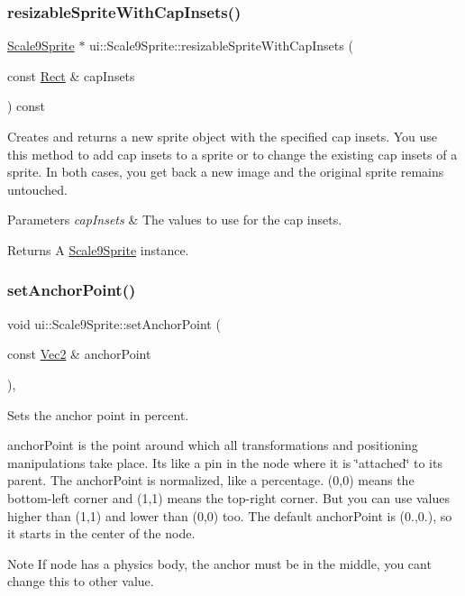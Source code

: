 \subsubsection{\texorpdfstring{resizable\+Sprite\+With\+Cap\+Insets()}{resizableSpriteWithCapInsets()}\hspace{0.1cm}{\footnotesize\ttfamily [2/2]}}
{\footnotesize\ttfamily \hyperlink{classui_1_1Scale9Sprite}{Scale9\+Sprite} $\ast$ ui\+::\+Scale9\+Sprite\+::resizable\+Sprite\+With\+Cap\+Insets (\begin{DoxyParamCaption}\item[{const \hyperlink{classRect}{Rect} \&}]{cap\+Insets }\end{DoxyParamCaption}) const}

Creates and returns a new sprite object with the specified cap insets. You use this method to add cap insets to a sprite or to change the existing cap insets of a sprite. In both cases, you get back a new image and the original sprite remains untouched.


\begin{DoxyParams}{Parameters}
{\em cap\+Insets} & The values to use for the cap insets. \\
\hline
\end{DoxyParams}
\begin{DoxyReturn}{Returns}
A \hyperlink{classui_1_1Scale9Sprite}{Scale9\+Sprite} instance. 
\end{DoxyReturn}
\mbox{\label{classui_1_1Scale9Sprite_a7153fb170a630efc0748e0db6678963f}} 
\subsubsection{\texorpdfstring{set\+Anchor\+Point()}{setAnchorPoint()}}
{\footnotesize\ttfamily void ui\+::\+Scale9\+Sprite\+::set\+Anchor\+Point (\begin{DoxyParamCaption}\item[{const \hyperlink{classVec2}{Vec2} \&}]{anchor\+Point }\end{DoxyParamCaption})\hspace{0.3cm}{\ttfamily [override]}, {\ttfamily [virtual]}}

Sets the anchor point in percent.

anchor\+Point is the point around which all transformations and positioning manipulations take place. It\textquotesingle{}s like a pin in the node where it is \char`\"{}attached\char`\"{} to its parent. The anchor\+Point is normalized, like a percentage. (0,0) means the bottom-\/left corner and (1,1) means the top-\/right corner. But you can use values higher than (1,1) and lower than (0,0) too. The default anchor\+Point is (0.,0.), so it starts in the center of the node. \begin{DoxyNote}{Note}
If node has a physics body, the anchor must be in the middle, you can\textquotesingle{}t change this to other value.
\end{DoxyNote}

